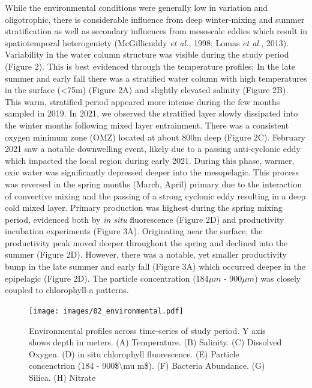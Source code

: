\documentclass[
]{article}
\begin{document}
While the environmental conditions were generally low in variation and
oligotrophic, there is considerable influence from deep winter-mixing
and summer stratification as well as secondary influences from mesoscale
eddies which result in spatiotemporal heterogeniety (McGillicuddy
\emph{et al.}, 1998; Lomas \emph{et al.}, 2013). Variability in the
water column structure was visible during the study period (Figure 2).
This is best evidenced through the temperature profiles; In the late
summer and early fall there was a stratified water column with high
temperatures in the surface (\textless75m) (Figure 2A) and slightly
elevated salinity (Figure 2B). This warm, stratified period appeared
more intense during the few months sampled in 2019. In 2021, we observed
the stratified layer slowly dissipated into the winter months following
mixed layer entrainment. There was a consistent oxygen minimum zone
(OMZ) located at about 800m deep (Figure 2C). February 2021 saw a
notable downwelling event, likely due to a passing anti-cyclonic eddy
which impacted the local region during early 2021. During this phase,
warmer, oxic water was significantly depressed deeper into the
mesopelagic. This process was reversed in the spring months (March,
April) primary due to the interaction of convective mixing and the
passing of a strong cyclonic eddy resulting in a deep cold mixed layer.
Primary production was highest during the spring mixing period,
evidenced both by \emph{in situ} fluorescence (Figure 2D) and
productivity incubation experiments (Figure 3A). Originating near the
surface, the productivity peak moved deeper throughout the spring and
declined into the summer (Figure 2D). However, there was a notable, yet
smaller productivity bump in the late summer and early fall (Figure 3A)
which occurred deeper in the epipelagic (Figure 2D). The particle
concentration (184\(\mu m\) - 900\(\mu m\)) was closely coupled to
chlorophyll-a patterns.

\begin{figure}[H]

{\centering \texttt{[image: images/02\_environmental.pdf]}

}

\caption{Environmental profiles across time-series of study period. Y
axis shows depth in meters. (A) Temperature. (B) Salinity. (C) Dissolved
Oxygen. (D) in situ chlorophyll fluorescence. (E) Particle concenctrion
(184 - 900\$\textbackslash mu m\$). (F) Bacteria Abundance. (G) Silica.
(H) Nitrate}

\end{figure}%
\end{document}
